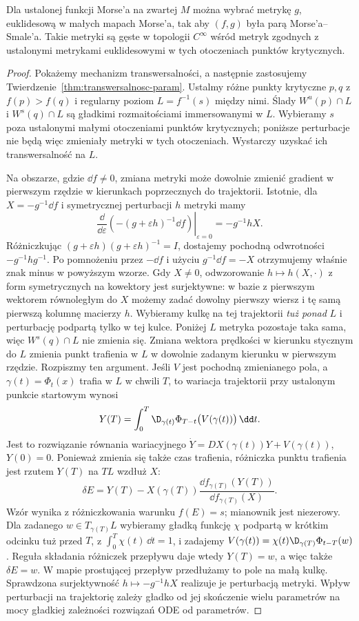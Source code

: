 \begin{twierdzenie}
\label{thm:gen-ms-17}
Dla ustalonej funkcji Morse'a
na zwartej $M$ można wybrać
metrykę $g$, euklidesową w małych
mapach Morse'a, tak aby
$(f,g)$ była parą
Morse'a--Smale'a. Takie metryki
są gęste w topologii $C^\infty$ wśród metryk
zgodnych z ustalonymi metrykami euklidesowymi
w tych otoczeniach punktów krytycznych.
\end{twierdzenie}
\begin{proof}
Pokażemy mechanizm
transwersalności, a następnie
zastosujemy
Twierdzenie~\ref{thm:transwersalnosc-param}.
Ustalmy różne punkty krytyczne
$p,q$ z $f(p)>f(q)$ i regularny
poziom $L=f^{-1}(s)$ między nimi.
Ślady $W^u(p)\cap L$ i $W^s(q)\cap L$
są gładkimi rozmaitościami immersowanymi w $L$.
Wybieramy $s$ poza ustalonymi małymi otoczeniami
punktów krytycznych; poniższe perturbacje
nie będą więc zmieniały metryki w tych otoczeniach.
Wystarczy uzyskać ich
transwersalność na $L$.

Na obszarze, gdzie $\dd f\ne0$,
zmiana metryki może dowolnie
zmienić gradient w pierwszym
rzędzie w kierunkach poprzecznych
do trajektorii. Istotnie, dla
$X=-g^{-1}\dd f$ i symetrycznej
perturbacji $h$ metryki mamy
\[
 \left.\frac{\dd}{\dd\varepsilon}
  (- (g+\varepsilon h)^{-1}\dd f)
 \right|_{\varepsilon=0}
  =-g^{-1}hX.
\]
Różniczkując $(g+\varepsilon h)(g+\varepsilon h)^{-1}=I$,
dostajemy pochodną odwrotności $-g^{-1}hg^{-1}$.
Po pomnożeniu przez $-\dd f$ i użyciu $g^{-1}\dd f=-X$
otrzymujemy właśnie znak minus w powyższym wzorze.
Gdy $X\ne0$, odwzorowanie
$h\mapsto h(X,\cdot)$ z form
symetrycznych na kowektory
jest surjektywne: w bazie
z pierwszym wektorem
równoległym do $X$ możemy
zadać dowolny pierwszy
wiersz i tę samą pierwszą
kolumnę macierzy $h$.
Wybieramy kulkę na tej
trajektorii \emph{tuż ponad} $L$
i perturbację podpartą tylko
w tej kulce. Poniżej $L$
metryka pozostaje taka sama,
więc $W^s(q)\cap L$ nie zmienia
się. Zmiana wektora prędkości
w kierunku stycznym do $L$
zmienia punkt trafienia w $L$
w dowolnie zadanym kierunku w pierwszym rzędzie.
Rozpiszmy ten argument. Jeśli $V$ jest pochodną zmienianego
pola, a $\gamma(t)=\Phi_t(x)$ trafia w $L$ w chwili $T$,
to wariacja trajektorii przy ustalonym punkcie startowym wynosi
\[
 Y(T)=\int_0^T \D_{\gamma(t)}\Phi_{T-t}
                          \bigl(V(\gamma(t))\bigr)\,\dd t.
\]
Jest to rozwiązanie równania wariacyjnego
$\dot Y=DX(\gamma(t))Y+V(\gamma(t))$, $Y(0)=0$.
Ponieważ zmienia się także czas trafienia, różniczka
punktu trafienia jest rzutem $Y(T)$ na $TL$ wzdłuż $X$:
\[
 \delta E=Y(T)-X(\gamma(T))
       \frac{\dd f_{\gamma(T)}(Y(T))}{\dd f_{\gamma(T)}(X)}.
\]
Wzór wynika z różniczkowania warunku $f(E)=s$;
mianownik jest niezerowy.
Dla zadanego $w\in T_{\gamma(T)}L$ wybieramy
gładką funkcję $\chi$ podpartą w krótkim odcinku tuż
przed $T$, z $\int_0^T\chi(t)\,\dd t=1$, i zadajemy
$V(\gamma(t))=\chi(t)\D_{\gamma(T)}\Phi_{t-T}(w)$.
Reguła składania różniczek przepływu daje wtedy $Y(T)=w$,
a więc także $\delta E=w$.
W mapie prostującej przepływ przedłużamy to pole
na małą kulkę. Sprawdzona surjektywność $h\mapsto-g^{-1}hX$
realizuje je perturbacją metryki.
Wpływ perturbacji na
trajektorię zależy gładko
od jej skończenie wielu
parametrów na mocy
gładkiej zależności
rozwiązań ODE od parametrów.


\end{proof}
